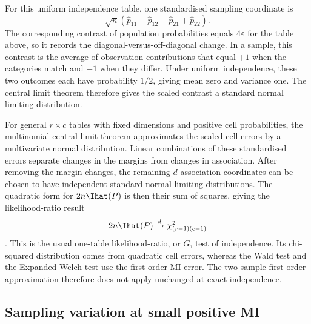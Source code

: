 For this uniform independence table, one standardised sampling coordinate is
\begin{equation*}
 \sqrt n\left(\widehat p_{11}-\widehat p_{12}
                   -\widehat p_{21}+\widehat p_{22}\right).
\end{equation*}
The corresponding contrast of population probabilities equals
\(4\varepsilon\) for the table above, so it records the
diagonal-versus-off-diagonal change. In a sample, this contrast
is the average of observation contributions that equal \(+1\) when the
categories match and \(-1\) when they differ. Under uniform independence,
these two outcomes each have probability \(1/2\), giving mean zero and
variance one. The central limit theorem therefore gives the scaled
contrast a standard normal limiting distribution.

For general \(r\times c\) tables with fixed dimensions and positive cell
probabilities, the multinomial central limit theorem approximates the scaled
cell errors by a multivariate normal distribution. Linear combinations of these
standardised errors separate changes in the margins from changes in
association. After removing the margin changes, the remaining
\(d\) association coordinates can be chosen to have independent standard
normal limiting distributions. The quadratic form for \(2n\Ihat(P)\)
is then their sum of squares, giving the likelihood-ratio result
\begin{equation}
 2n\Ihat(P)\xrightarrow{d}\chi^2_{(r-1)(c-1)}
 \label{eq:independence-chi-squared}
\end{equation}
\citep{wilks1938,brillinger2004}. This is the usual one-table likelihood-ratio,
or \(G\), test of independence. Its chi-squared distribution comes from
quadratic cell errors, whereas the Wald test and the Expanded Welch test use the
first-order MI error. The two-sample first-order approximation therefore
does not apply unchanged at exact independence.

\subsection{Sampling variation at small positive MI}

